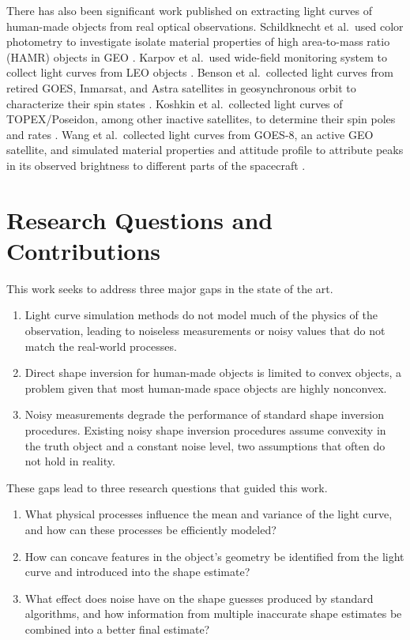 There has also been significant work published on extracting light curves of human-made objects from real optical observations. Schildknecht et al.\ used color photometry to investigate isolate material properties of high area-to-mass ratio (HAMR) objects in GEO \cite{schildknecht2008}. Karpov et al.\ used wide-field monitoring system to collect light curves from LEO objects \cite{karpov2016}. Benson et al.\ collected light curves from retired GOES, Inmarsat, and Astra satellites in geosynchronous orbit to characterize their spin states \cite{benson2017}. Koshkin et al.\ collected light curves of TOPEX/Poseidon, among other inactive satellites, to determine their spin poles and rates \cite{koshkin2018}. Wang et al.\ collected light curves from GOES-8, an active GEO satellite, and simulated material properties and attitude profile to attribute peaks in its observed brightness to different parts of the spacecraft \cite{wang2018}.

\section{Research Questions and Contributions}

\noindent This work seeks to address three major gaps in the state of the art.

\begin{enumerate}
    \item Light curve simulation methods do not model much of the physics of the observation, leading to noiseless measurements or noisy values that do not match the real-world processes.
    \item Direct shape inversion for human-made objects is limited to convex objects, a problem given that most human-made space objects are highly nonconvex.
    \item Noisy measurements degrade the performance of standard shape inversion procedures. Existing noisy shape inversion procedures assume convexity in the truth object and a constant noise level, two assumptions that often do not hold in reality. 
\end{enumerate}

\noindent These gaps lead to three research questions that guided this work.

\begin{enumerate}
    \item What physical processes influence the mean and variance of the light curve, and how can these processes be efficiently modeled?
    \item How can concave features in the object's geometry be identified from the light curve and introduced into the shape estimate?
    \item What effect does noise have on the shape guesses produced by standard algorithms, and how information from multiple inaccurate shape estimates be combined into a better final estimate?
\end{enumerate}

